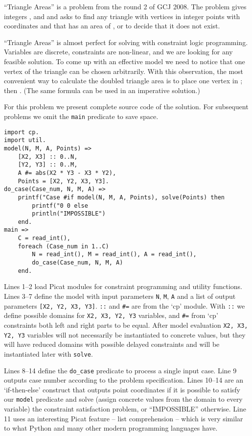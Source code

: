 \documentclass{llncs}
\begin{document}
``Triangle Areas'' is a problem from the round 2 of GCJ 2008.
The problem gives integers ,  and  and asks to find any
triangle with vertices in integer points with coordinates 
and  that has an area of , or to decide that it does not exist.

``Triangle Areas'' is almost perfect for solving with constraint logic programming.
Variables are discrete, constraints are non-linear, and we are looking for any feasible solution.
To come up with an effective model we need to notice that one vertex of the triangle can be chosen arbitrarily.
With this observation, the most convenient way to calculate the doubled triangle area is to place one vertex in ; then .
(The same formula can be used in an imperative solution.)

For this problem we present complete source code of the solution.
For subsequent problems we omit the \texttt{main} predicate to save space.

\begin{lstlisting}[caption={Complete Picat program for the ``Triangle Areas'' problem}]
import cp.
import util.
model(N, M, A, Points) =>
    [X2, X3] :: 0..N,
    [Y2, Y3] :: 0..M,
    A #= abs(X2 * Y3 - X3 * Y2),
    Points = [X2, Y2, X3, Y3].
do_case(Case_num, N, M, A) =>
    printf("Case #if model(N, M, A, Points), solve(Points) then
        printf("0 0 else
        println("IMPOSSIBLE")
    end.
main =>
    C = read_int(),
    foreach (Case_num in 1..C)
        N = read_int(), M = read_int(), A = read_int(),
        do_case(Case_num, N, M, A)
    end.
\end{lstlisting}

Lines 1--2 load Picat modules for constraint programming and utility functions.
Lines 3--7 define the model with input parameters \texttt{N}, \texttt{M}, \texttt{A} and a list of output parameters \texttt{[X2, Y2, X3, Y3]}.
\texttt{::} and \texttt{\#=} are from the `cp' module.
With \texttt{::} we define possible domains for \texttt{X2, X3, Y2, Y3} variables,
and \texttt{\#=} from `cp' constraints both left and right parts to be equal.
After model evaluation \texttt{X2, X3, Y2, Y3} variables will not necessarily be instantiated to concrete values, but they will have reduced domains with possible delayed constraints
and will be instantiated later with \texttt{solve}.

Lines 8--14 define the \texttt{do\_case} predicate to process a single input case. Line 9 outputs case number according to the problem specification.
Lines 10--14 are an `if-then-else' construct that outputs point coordinates if it is possible to satisfy our \texttt{model} predicate and solve
(assign concrete values from the domain to every variable) the constraint satisfaction problem, or ``IMPOSSIBLE'' otherwise.
Line 11 uses an interesting Picat feature -- list comprehension -- which is very similar to what Python and many other modern programming languages have.
\end{document}
